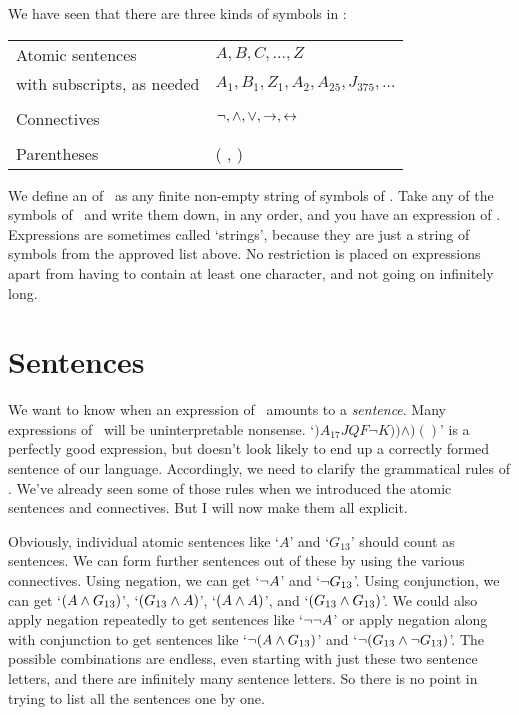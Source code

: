 We have seen that there are three kinds of symbols in \TFL:
\begin{center}
\begin{tabular}{l l} \toprule 
Atomic sentences & $A,B,C,…,Z$\\
with subscripts, as needed & $A_1, B_1,Z_1,A_2,A_{25},J_{375},…$\\
\\
Connectives & $\neg,\wedge,\vee,\rightarrow,\leftrightarrow$\\
\\
Parentheses &( , )\\
\bottomrule \end{tabular} 
\end{center}
We define an  of \TFL\ as any finite non-empty string of symbols of \TFL. Take any of the symbols of \TFL\ and write them down, in any order, and you have an expression of \TFL. Expressions are sometimes called `strings', because they are just a string of symbols from the approved list above. No restriction is placed on expressions apart from having to contain at least one character, and not going on infinitely long.


\section{Sentences}\label{s.sentencesTFL}
We want to know when an expression of \TFL\ amounts to a \emph{sentence}. Many expressions of \TFL\ will be uninterpretable nonsense. `$)A_{17}JQF¬K))\wedge)()$' is a perfectly good expression, but doesn't look likely to end up a correctly formed sentence of our language.  Accordingly, we need to clarify the grammatical rules of \TFL. We've already seen some of those rules when we introduced the atomic sentences and connectives. But I will now make them all explicit. 

Obviously, individual atomic sentences like `$A$' and `$G_{13}$' should count as sentences. We can form further sentences out of these by using the various connectives. Using negation, we can get `$\neg A$' and `$\neg G_{13}$'. Using conjunction, we can get `$(A \wedge G_{13})$', `$(G_{13} \wedge A)$', `$(A \wedge A)$', and `$(G_{13} \wedge G_{13})$'. We could also apply negation repeatedly to get sentences like `$\neg \neg A$' or apply negation along with conjunction to get sentences like `$\neg(A \wedge G_{13})$' and `$\neg(G_{13} \wedge \neg G_{13})$'. The possible combinations are endless, even starting with just these two sentence letters, and there are infinitely many sentence letters. So there is no point in trying to list all the sentences one by one.

